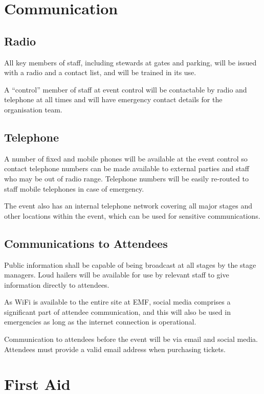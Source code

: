 \section{Communication}

\subsection{Radio}
All key members of staff, including stewards at gates and parking,
will be issued with a radio and a contact list, and will be trained in its use.

A ``control'' member of staff at event control will be contactable by
radio and telephone at all times and will have emergency contact details for the
organisation team.

\subsection{Telephone}
A number of fixed and mobile phones will be available at the event control so
contact telephone numbers can be made available to external parties and staff
who may be out of radio range. Telephone numbers will be easily re-routed to
staff mobile telephones in case of emergency.

The event also has an internal telephone network covering all major stages and
other locations within the event, which can be used for sensitive
communications.

\subsection{Communications to Attendees}\label{attendeecomms}
Public information shall be capable of being broadcast at all stages by the
stage managers. Loud hailers will be available for use by relevant staff to
give information directly to attendees.

As WiFi is available to the entire site at EMF, social media comprises a
significant part of attendee communication, and this will also be used in
emergencies as long as the internet connection is operational.

Communication to attendees before the event will be via email and social
media. Attendees must provide a valid email address when purchasing tickets.

\section{First Aid}

